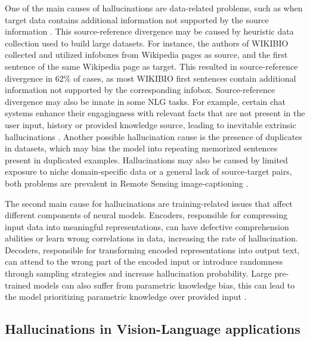 One of the main causes of hallucinations are data-related problems, such as when target data contains additional information not supported by the source information \cite{jiSurveyHallucinationNatural2023}. This source-reference divergence may be caused by heuristic data collection used to build large datasets. For instance, the authors of WIKIBIO \cite{lebretNeuralTextGeneration2016}  collected and utilized infoboxes from Wikipedia pages as source, and the first sentence of the same Wikipedia page as target. This resulted in source-reference divergence in 62\% of cases, as most WIKIBIO first sentences contain additional information not supported by the corresponding infobox. Source-reference divergence may also be innate in some NLG tasks. For example, certain chat systems enhance their engagingness with relevant facts that are not present in the user input, history or provided knowledge source, leading to inevitable extrinsic hallucinations \cite{jiSurveyHallucinationNatural2023}. Another possible hallucination cause is the presence of duplicates in datasets, which may bias the model into repeating memorized sentences present in duplicated examples. Hallucinations may also be caused by limited exposure to niche domain-specific data or a general lack of source-target pairs, both problems are prevalent in Remote Sensing image-captioning \cite{andersonMeasuringMitigatingHallucinations2025}.

The second main cause for hallucinations are training-related issues that affect different components of neural models. Encoders, responsible for compressing input data into meaningful representations, can have defective comprehension abilities or learn wrong correlations in data, increasing the rate of hallucination. Decoders, responsible for transforming encoded representations into output text, can attend to the wrong part of the encoded input or introduce randomness through sampling strategies and increase hallucination probability. Large pre-trained models can also suffer from parametric knowledge bias, this can lead to the model prioritizing parametric knowledge over provided input \cite{jiSurveyHallucinationNatural2023}.

\subsection{Hallucinations in Vision-Language applications}


